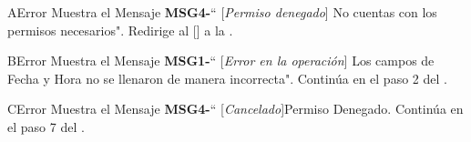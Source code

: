 \begin{UCtrayectoriaA}{A}{Error}
			\UCpaso Muestra el Mensaje {\bf MSG4-}`` [{\em Permiso denegado}] No cuentas con los permisos necesarios".
			\UCpaso  Redirige al [\UCactor] a la .
		\end{UCtrayectoriaA}

\begin{UCtrayectoriaA}{B}{Error}
			\UCpaso Muestra el Mensaje {\bf MSG1-}`` [{\em Error en la operación}] Los campos de Fecha y Hora no se llenaron de manera incorrecta".
			\UCpaso Continúa en el paso 2 del .
		\end{UCtrayectoriaA}

\begin{UCtrayectoriaA}{C}{Error}
			\UCpaso Muestra el Mensaje {\bf MSG4-}`` [{\em Cancelado}]Permiso Denegado.
			\UCpaso Continúa en el paso 7 del .
		\end{UCtrayectoriaA}
